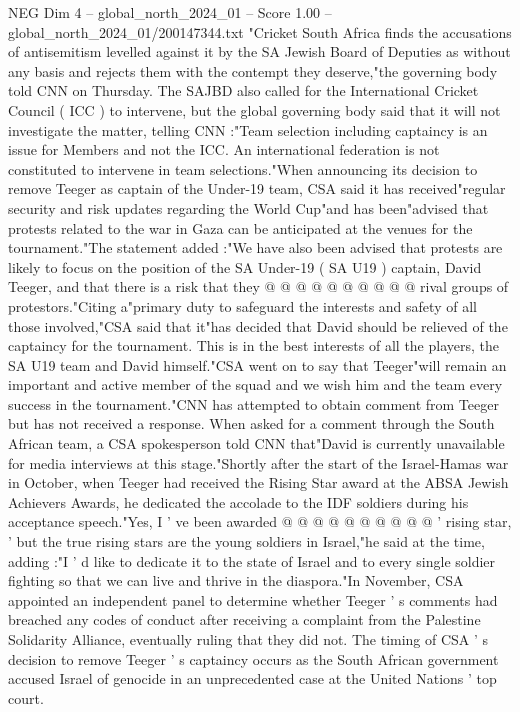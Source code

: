 \begin{textsample}{NEG Dim 4 – global\_north\_2024\_01 – Score 1.00 – global\_north\_2024\_01/200147344.txt}  \label{ex:f4_neg_119}
"Cricket South Africa finds the accusations of antisemitism levelled against it by the SA Jewish Board of Deputies as without any basis and rejects them with the contempt they deserve,"the governing body told CNN on Thursday.
The SAJBD also called for the International Cricket Council ( ICC ) to intervene, but the global governing body said that it will not investigate the matter, telling CNN :"Team selection including captaincy is an issue for Members and not the ICC.
An international federation is not constituted to intervene in team selections."When announcing its decision to remove Teeger as captain of the Under-19 team, CSA said it has received"regular security and risk updates regarding the World Cup"and has been"advised that protests related to the war in Gaza can be anticipated at the venues for the tournament."The statement added :"We have also been advised that protests are likely to focus on the position of the SA Under-19 ( SA U19 ) captain, David Teeger, and that there is a risk that they @ @ @ @ @ @ @ @ @ @ rival groups of protestors."Citing a"primary duty to safeguard the interests and safety of all those involved,"CSA said that it"has decided that David should be relieved of the captaincy for the tournament.
This is in the best interests of all the players, the SA U19 team and David himself."CSA went on to say that Teeger"will remain an important and active member of the squad and we wish him and the team every success in the tournament."CNN has attempted to obtain comment from Teeger but has not received a response.
When asked for a comment through the South African team, a CSA spokesperson told CNN that"David is currently unavailable for media interviews at this stage."Shortly after the start of the Israel-Hamas war in October, when Teeger had received the Rising Star award at the ABSA Jewish Achievers Awards, he dedicated the accolade to the IDF soldiers during his acceptance speech."Yes, I ' ve been awarded @ @ @ @ @ @ @ @ @ @ ' rising star, ' but the true rising stars are the young soldiers in Israel,"he said at the time, adding :"I ' d like to dedicate it to the state of Israel and to every single soldier fighting so that we can live and thrive in the diaspora."In November, CSA appointed an independent panel to determine whether Teeger ' s comments had breached any codes of conduct after receiving a complaint from the Palestine Solidarity Alliance, eventually ruling that they did not.
The timing of CSA ' s decision to remove Teeger ' s captaincy occurs as the South African government accused Israel of genocide in an unprecedented case at the United Nations ' top court.

\end{textsample}
